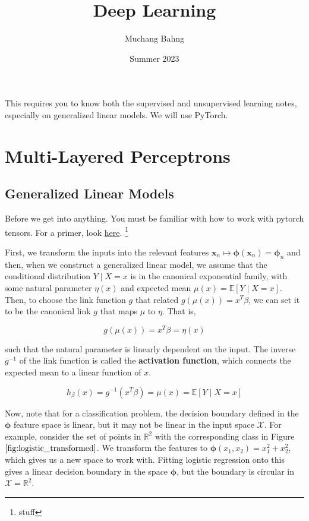 \documentclass{article}
\begin{document}
\title{Deep Learning}
\author{Muchang Bahng}
\date{Summer 2023}

\maketitle

\tableofcontents

\pagebreak 
%
This requires you to know both the supervised and unsupervised learning notes, especially on generalized linear models. We will use PyTorch.

\section{Multi-Layered Perceptrons}

  \subsection{Generalized Linear Models}

    \begin{code}
      Before we get into anything. You must be familiar with how to work with pytorch tensors. For a primer, look \href{code/utilities.ipynb}{here}. \footnote{stuff}
    \end{code}

     First, we transform the inputs into the relevant features $\mathbf{x}_n \mapsto \boldsymbol{\phi} (\mathbf{x}_n) = \boldsymbol{\phi}_n$ and then, when we construct a generalized linear model, we assume that the conditional distribution $Y \mid X = x$ is in the canonical exponential family, with some natural parameter $\eta(x)$ and expected mean $\mu(x) = \mathbb{E}[Y \mid X = x]$. Then, to choose the link function $g$ that related $g(\mu(x)) = x^T \beta$, we can set it to be the canonical link $g$ that maps $\mu$ to $\eta$. That is, 
    
    \[g(\mu(x)) = x^T \beta = \eta (x)\]

    such that the natural parameter is linearly dependent on the input. The inverse $g^{-1}$ of the link function is called the \textbf{activation function}, which connects the expected mean to a linear function of $x$. 

      \[h_\beta (x) = g^{-1} (x^T \beta) = \mu(x) = \mathbb{E}[Y \mid X = x]\]

    Now, note that for a classification problem, the decision boundary defined in the $\boldsymbol{\phi}$ feature space is linear, but it may not be linear in the input space $\mathcal{X}$. For example, consider the set of points in $\mathbb{R}^2$ with the corresponding class in Figure $\ref{fig:logistic_transformed}$. We transform the features to $\boldsymbol{\phi}(x_1, x_2) = x_1^2 + x_2^2$, which gives us a new space to work with. Fitting logistic regression onto this gives a linear decision boundary in the space $\boldsymbol{\phi}$, but the boundary is circular in $\mathcal{X} = \mathbb{R}^2$. 
\end{document}
